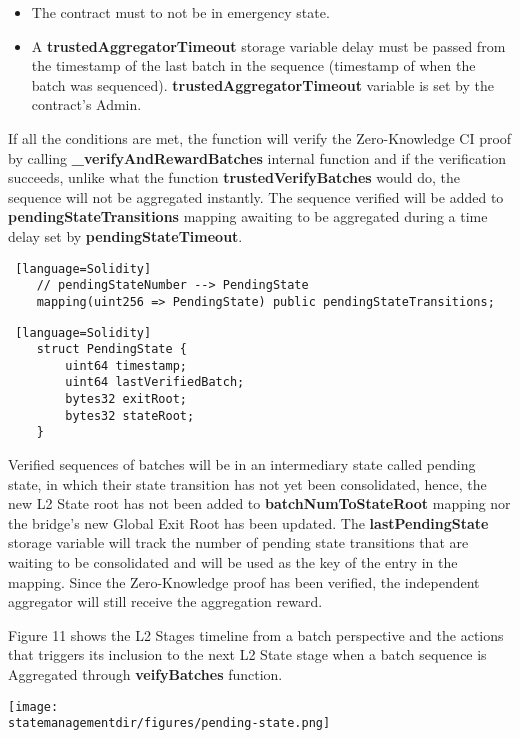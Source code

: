 \begin{itemize}
	\item The contract must to not be in emergency state.
	\item A \textbf{trustedAggregatorTimeout} storage variable delay must be passed from the timestamp of the last batch in the sequence (timestamp of when the batch was sequenced). \textbf{trustedAggregatorTimeout} variable is set by the contract's Admin. 
\end{itemize}

If all the conditions are met, the function will verify the Zero-Knowledge CI proof by calling \textbf{\_verifyAndRewardBatches} internal function and if the verification succeeds, unlike what the function \textbf{trustedVerifyBatches} would do, the sequence will not be aggregated instantly. The sequence verified will be added to \textbf{pendingStateTransitions} mapping awaiting to be aggregated during a time delay set by \textbf{pendingStateTimeout}.

\begin{lstlisting} [language=Solidity]
	// pendingStateNumber --> PendingState
	mapping(uint256 => PendingState) public pendingStateTransitions;
\end{lstlisting}



\begin{lstlisting} [language=Solidity]
	struct PendingState {
		uint64 timestamp;
		uint64 lastVerifiedBatch;
		bytes32 exitRoot;
		bytes32 stateRoot;
	}
\end{lstlisting}

Verified sequences of batches will be in an intermediary state called pending state, in which their state transition has not yet been consolidated, hence, the new L2 State root has not been added to \textbf{batchNumToStateRoot} mapping nor the bridge's new Global Exit Root has been updated. The \textbf{lastPendingState} storage variable will track the number of pending state transitions that are waiting to be consolidated and will be used as the key of the entry in the mapping. Since the Zero-Knowledge proof has been verified, the independent aggregator will still receive the aggregation reward.

Figure 11 shows the L2 Stages timeline from a batch perspective and the actions that triggers its inclusion to the next L2 State stage when a batch sequence is Aggregated through \textbf{veifyBatches} function. 
\begin{center}
	\texttt{[image: \\statemanagementdir/figures/pending-state.png]}
	
\end{center}


